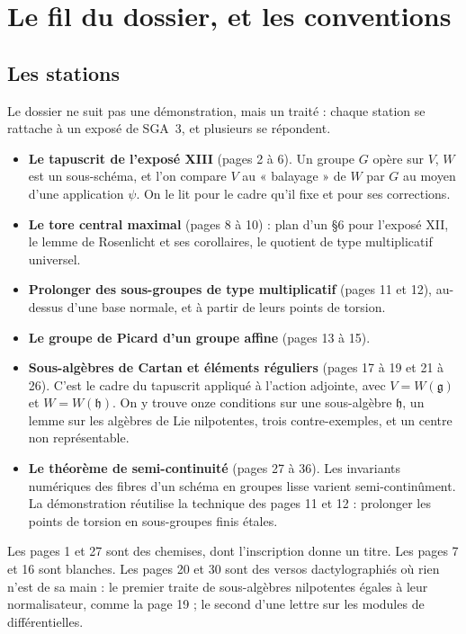\documentclass[11pt,a4paper]{article}
\begin{document}
\section*{Le fil du dossier, et les conventions}

\subsection*{Les stations}

Le dossier ne suit pas une démonstration, mais un traité : chaque station se
rattache à un exposé de SGA~3, et plusieurs se répondent.

\begin{itemize}
\item \textbf{Le tapuscrit de l'exposé XIII} (pages 2 à 6). Un groupe $G$
opère sur $V$, $W$ est un sous-schéma, et l'on compare $V$ au « balayage » de
$W$ par $G$ au moyen d'une application $\psi$. On le lit pour le cadre qu'il
fixe et pour ses corrections.
\item \textbf{Le tore central maximal} (pages 8 à 10) : plan d'un §6 pour
l'exposé XII, le lemme de Rosenlicht et ses corollaires, le quotient de type
multiplicatif universel.
\item \textbf{Prolonger des sous-groupes de type multiplicatif} (pages 11 et
12), au-dessus d'une base normale, et à partir de leurs points de torsion.
\item \textbf{Le groupe de Picard d'un groupe affine} (pages 13 à 15).
\item \textbf{Sous-algèbres de Cartan et éléments réguliers} (pages 17 à 19 et
21 à 26). C'est le cadre du tapuscrit appliqué à l'action adjointe, avec
$V = W(\mathfrak{g})$ et $W = W(\mathfrak{h})$. On y trouve onze conditions
sur une sous-algèbre $\mathfrak{h}$, un lemme sur les algèbres de Lie
nilpotentes, trois contre-exemples, et un centre non représentable.
\item \textbf{Le théorème de semi-continuité} (pages 27 à 36). Les invariants
numériques des fibres d'un schéma en groupes lisse varient
semi-continûment. La démonstration réutilise la technique des pages 11 et
12 : prolonger les points de torsion en sous-groupes finis étales.
\end{itemize}

Les pages 1 et 27 sont des chemises, dont l'inscription donne un titre. Les
pages 7 et 16 sont blanches. Les pages 20 et 30 sont des versos dactylographiés
où rien n'est de sa main : le premier traite de sous-algèbres nilpotentes
égales à leur normalisateur, comme la page 19 ; le second d'une lettre sur
les modules de différentielles.
\end{document}
